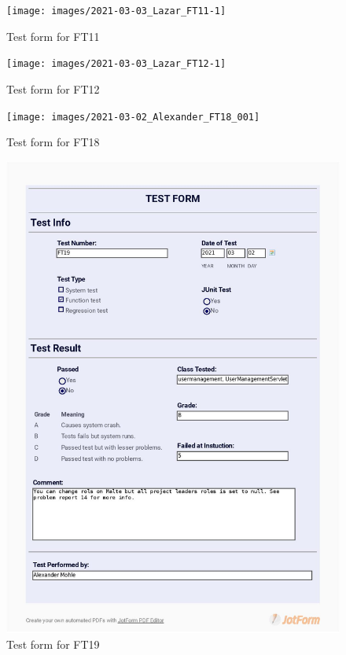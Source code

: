 \documentclass{article}
\begin{document}
 \begin{figure}
     \centering
     \texttt{[image: images/2021-03-03\_Lazar\_FT11-1]}
     \renewcommand\figurename{Figure}
     \caption{Test form for FT11}
     \label{fig:my_label}
 \end{figure}
 
 \begin{figure}
     \centering
     \texttt{[image: images/2021-03-03\_Lazar\_FT12-1]}
     \renewcommand\figurename{Figure}
     \caption{Test form for FT12}
     \label{fig:my_label}
 \end{figure}
 
 \begin{figure}
     \centering
     \texttt{[image: images/2021-03-02\_Alexander\_FT18\_001]}
     \renewcommand\figurename{Figure}
     \caption{Test form for FT18}
     \label{fig:my_label}
 \end{figure}
 
 \begin{figure}
     \centering
     \includegraphics[width=13cm]{images/2021-03-02_Alexander_FT19_001}
     \renewcommand\figurename{Figure}
     \caption{Test form for FT19}
     \label{fig:my_label}
 \end{figure}
 
\end{document}
